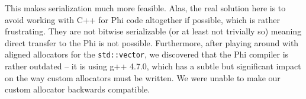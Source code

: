 This makes serialization much more feasible.  Alas, the real solution here is to avoid working with C++ for Phi code
altogether if possible, which is rather frustrating.  They are not bitwise serializable (or at least not trivially so)
meaning direct transfer to the Phi is not possible.  Furthermore, after playing around with aligned allocators for the
\texttt{std::vector}, we discovered that the Phi compiler is rather outdated -- it is using g++ 4.7.0, which has a subtle
but significant impact on the way custom allocators must be written.  We were unable to make our custom allocator
backwards compatible.



